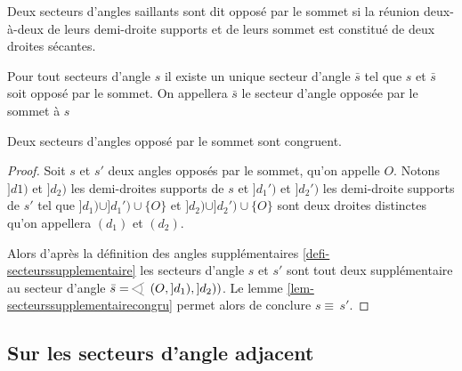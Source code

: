 \begin{defi}
    Deux secteurs d'angles saillants sont dit opposé par le sommet si la réunion deux-à-deux de leurs demi-droite supports et de leurs sommet est constitué de deux droites sécantes.
\end{defi}
\begin{prop}\label{prop-existetuniqueopposesommet}
    Pour tout secteurs d'angle $s$ il existe un unique secteur d'angle $\bar{s}$ tel que $s$ et $\bar{s}$ soit opposé par le sommet. On appellera $\bar{s}$ le secteur d'angle opposée par le sommet à $s$
\end{prop}
\begin{cor}\label{cor-anglesometcongru}
    Deux secteurs d'angles opposé par le sommet sont congruent.
\begin{proof}
    Soit $s$ et $s'$ deux angles opposés par le sommet, qu'on appelle $O$. Notons $]d1)$ et $]d_2)$ les demi-droites supports de $s$ et $]d_1')$ et $]d_2')$ les demi-droite supports de $s'$ tel que $]d_1)\cup ]d_1') \cup \{O\}$ et $]d_2)\cup ]d_2') \cup \{O\}$ sont deux droites distinctes qu'on appellera $(d_1)$ et $(d_2)$. 
    
    Alors d'après la définition des angles supplémentaires \ref{defi-secteurssupplementaire} les secteurs d'angle $s$ et $s'$ sont tout deux supplémentaire au secteur d'angle $\bar{s} = \anglesaillant\left(O,]d_1),]d_2)\right)$. Le lemme \ref{lem-secteurssupplementairecongru} permet alors de conclure $s\equiv \,s'$.
\end{proof}
\end{cor}

    \subsection{Sur les secteurs d'angle adjacent}

